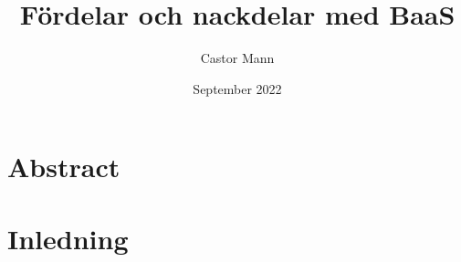 \documentclass{article}
\title{Fördelar och nackdelar med BaaS}
\author{Castor Mann }
\date{September 2022}
\begin{document}
\maketitle

\section{Abstract}

\section{Inledning}
\end{document}
